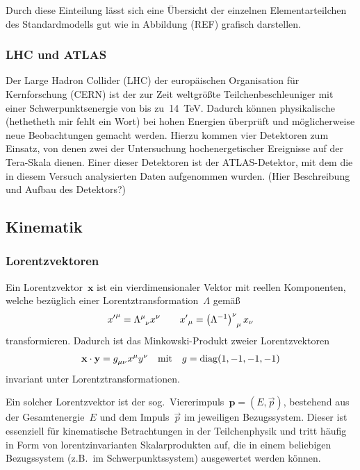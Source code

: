 \documentclass[11pt, a4paper]{article}
\numberwithin{equation}{section}
\newcommand{\korr}[1]{{\color{red}(#1)}}
\begin{document}
Durch diese Einteilung lässt sich eine Übersicht der einzelnen Elementarteilchen des Standardmodells gut wie in Abbildung \korr{REF} grafisch darstellen.

\subsubsection{LHC und ATLAS}

Der Large Hadron Collider (LHC) der europäischen Organisation für Kernforschung (CERN) ist der zur Zeit weltgrößte Teilchenbeschleuniger mit einer Schwerpunktsenergie von bis zu~\SI{14}{TeV}.
Dadurch können physikalische \korr{hethetheth mir fehlt ein Wort} bei hohen Energien überprüft und möglicherweise neue Beobachtungen gemacht werden.
Hierzu kommen vier Detektoren zum Einsatz, von denen zwei der Untersuchung hochenergetischer Ereignisse auf der Tera-Skala dienen.
Einer dieser Detektoren ist der ATLAS-Detektor, mit dem die in diesem Versuch analysierten Daten aufgenommen wurden.
\korr{Hier Beschreibung und Aufbau des Detektors?}

\subsection{Kinematik}

\subsubsection{Lorentzvektoren}
Ein Lorentzvektor~$\mathbf{x}$ ist ein vierdimensionaler Vektor mit reellen Komponenten, welche bezüglich einer Lorentztransformation~$\Lambda$ gemäß
\begin{align*}
	{x^\prime}^\mu = \tensor{\Lambda}{^\mu_\nu} x^\nu \qquad {x^\prime}_\mu = \tensor{\left(\Lambda^{-1}\right)}{^\nu_\mu} x_\nu
\end{align*}
transformieren.
Dadurch ist das Minkowski-Produkt zweier Lorentzvektoren
\begin{align*}
	\mathbf{x} \cdot \mathbf{y} = \tensor{g}{_\mu_\nu} x^\mu y^\nu \quad \text{mit} \quad g = \mathrm{diag}(1,-1,-1,-1)
\end{align*}
invariant unter Lorentztransformationen.

Ein solcher Lorentzvektor ist der sog.\ Viererimpuls~$\mathbf{p} = \left(E, \vec{p}\right)$, bestehend aus der Gesamtenergie~$E$ und dem Impuls~$\vec{p}$ im jeweiligen Bezugssystem.
Dieser ist essenziell für kinematische Betrachtungen in der Teilchenphysik und tritt häufig in Form von lorentzinvarianten Skalarprodukten auf, die in einem beliebigen Bezugssystem (z.B.\ im Schwerpunktssystem) ausgewertet werden können.
\end{document}
